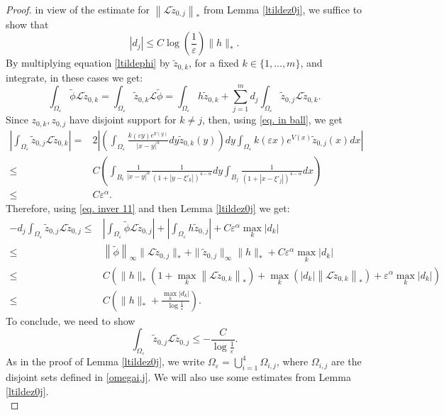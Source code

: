 \documentclass[11pt]{article}
\begin{document}
\begin{proof}
in view of the estimate for $\left\|\mathcal L\widetilde z_{0,j}\right\|_\ast$ from Lemma \ref{ltildez0j}, we suffice to show that
$$|d_j|\le C\log\left(\frac1\varepsilon\right)\|h\|_\ast.$$
By multiplying equation \eqref{ltildephi} by $\widetilde z_{0,k}$, for a fixed $k\in\{1,\dots,m\}$, and integrate, in these cases we get:
$$\int_{\Omega_\varepsilon}\widetilde\phi\mathcal L\widetilde z_{0,k}=\int_{\Omega_\varepsilon}\widetilde z_{0,k}\mathcal L\widetilde\phi=\int_{\Omega_\varepsilon}h\widetilde z_{0,k}+\sum_{j=1}^md_j\int_{\Omega_\varepsilon}\widetilde z_{0,j}\mathcal L\widetilde z_{0,k}.$$
Since $z_{0,k},z_{0,j}$ have disjoint support for $k\ne j$, then, using \eqref{eq. in ball}, we get
\begin{align*}
\left|\int_{\Omega_\varepsilon}\widetilde z_{0,j}\mathcal L\widetilde z_{0,k}\right|=&2\left|\left(\int_{\Omega_\varepsilon}\frac{k(\varepsilon y)e^{V(y)}}{|x-y|^\alpha}dy\widetilde z_{0,k}(y)\right)dy\int_{\Omega_\varepsilon}k(\varepsilon x)e^{V(x)}\widetilde z_{0,j}(x)dx\right|\\
\le&C\left(\int_{B_i}\frac1{|x-y|^\alpha}\frac1{(1+|y-\xi'_k|)^{4-\alpha}}dy\int_{B_j}\frac1{\left(1+\left|x-\xi'_j\right|\right)^{4-\alpha}}dx\right)\\
\le&C\varepsilon^\alpha.
\end{align*}
Therefore, using \eqref{eq. inver 11} and then Lemma \ref{ltildez0j} we get:
\begin{align*}
-d_j\int_{\Omega_\varepsilon}\widetilde z_{0,j}\mathcal L\widetilde z_{0,j}\le&\left|\int_{\Omega_\varepsilon}\widetilde\phi\mathcal L\widetilde z_{0,j}\right|+\left|\int_{\Omega_\varepsilon}h\widetilde z_{0,j}\right|+C\varepsilon^\alpha\max_k|d_k|\\
\le&\left\|\widetilde\phi\right\|_\infty\|\mathcal L\widetilde z_{0,j}\|_\ast+\|\widetilde z_{0,j}\|_\infty\|h\|_\ast+C\varepsilon^\alpha\max_k|d_k|\\
\le&C\left(\|h\|_\ast\left(1+\max_k\left\|\mathcal L\widetilde z_{0,k}\right\|_\ast\right)+\max_k\left(|d_k|\left\|\mathcal L\widetilde z_{0,k}\right\|_\ast\right)+\varepsilon^\alpha\max_k|d_k|\right)\\
\le&C\left(\|h\|_\ast+\frac{\max_k|d_k|}{\log\frac1\varepsilon}\right).
\end{align*}
To conclude, we need to show
$$\int_{\Omega_\varepsilon}\widetilde z_{0,j}\mathcal L\widetilde z_{0,j}\le-\frac C{\log\frac1\varepsilon}.$$
As in the proof of Lemma \ref{ltildez0j}, we write $\Omega_\varepsilon=\bigcup_{i=1}^4\Omega_{i,j}$, where $\Omega_{i,j}$ are the disjoint sets defined in \eqref{omegai,j}. We will also use some estimates from Lemma \ref{ltildez0j}.\\

\end{proof}
\end{document}
